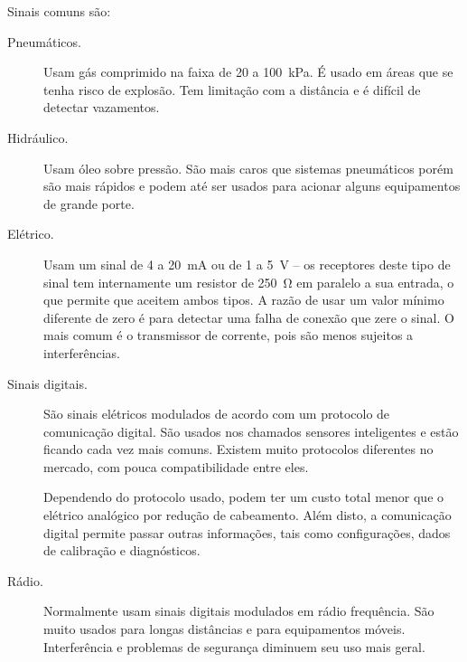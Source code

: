 Sinais comuns são:
\begin{description}
  \item[Pneumáticos.] Usam gás comprimido na faixa de 20 a \SI{100}{\kilo\pascal}. É usado em áreas que se tenha risco de explosão. Tem limitação com a distância e é difícil de detectar vazamentos.

  \item[Hidráulico.] Usam óleo sobre pressão. São mais caros que sistemas pneumáticos porém são mais rápidos e podem até ser usados para acionar alguns equipamentos de grande porte.
  \item[Elétrico.] Usam um sinal de 4 a \SI{20}{mA} ou de 1 a \SI{5}{\volt} -- os receptores deste tipo de sinal tem internamente um resistor de \SI{250}{\ohm} em paralelo a sua entrada, o que permite que aceitem ambos tipos. A razão de usar um valor mínimo diferente de zero é para detectar uma falha de conexão que zere o sinal. O mais comum é o transmissor de corrente, pois são menos sujeitos a interferências.
  \item[Sinais digitais.] São sinais elétricos modulados de acordo com um protocolo de comunicação digital. São usados nos chamados sensores inteligentes e estão ficando cada vez mais comuns. Existem muito protocolos diferentes no mercado, com pouca compatibilidade entre eles.

  Dependendo do protocolo usado, podem ter um custo total menor que o elétrico analógico por redução de cabeamento. Além disto, a comunicação digital permite passar outras informações, tais como configurações, dados de calibração e diagnósticos.

  \item[Rádio.] Normalmente usam sinais digitais modulados em rádio frequência. São muito usados para longas distâncias e para equipamentos móveis. Interferência e problemas de segurança diminuem seu uso mais geral.
\end{description}
